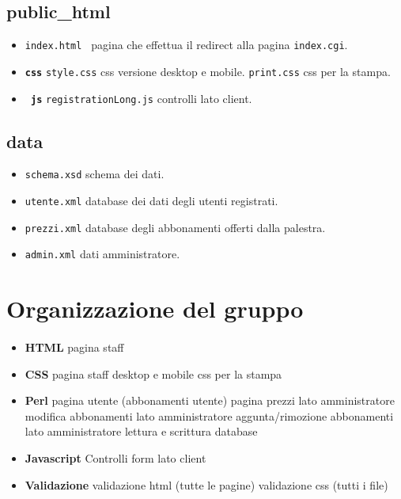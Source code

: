 \documentclass[12pt,a4paper]{article}
\begin{document}
\subsection{public\_html}
\begin{itemize}
	\item \texttt{index.html } pagina che effettua il redirect alla pagina \texttt{index.cgi}.
	\item \texttt{\textbf{css}}
		\subitem \texttt{style.css} css versione desktop e mobile. 
		\subitem \texttt{print.css} css per la stampa.
	\item\texttt{\textbf{ js}}
	\subitem \texttt{registrationLong.js} controlli lato client. 
\end{itemize}
\subsection{data}
\begin{itemize}
	\item \texttt{schema.xsd} schema dei dati. 
	\item \texttt{utente.xml} database dei dati degli utenti registrati. 
	\item \texttt{prezzi.xml} database degli abbonamenti offerti dalla palestra. 
	\item \texttt{admin.xml} dati amministratore. 
\end{itemize}

\section{Organizzazione del gruppo}
\paragraph{\TF{}}
\begin{itemize}
	\item \textbf{HTML}
	\subitem pagina staff
	\item \textbf{CSS}
	\subitem pagina staff desktop e mobile
	\subitem css per la stampa
	\item\textbf{Perl}
	\subitem pagina utente (abbonamenti utente)
	\subitem pagina prezzi lato amministratore
	\subitem modifica abbonamenti lato amministratore
	\subitem aggunta/rimozione abbonamenti lato amministratore
	\subitem lettura e scrittura database
	\item \textbf{Javascript}
	\subitem Controlli form lato client
	\item \textbf{Validazione}
	\subitem validazione html (tutte le pagine)
	\subitem validazione css (tutti i file)
	
	
\end{itemize}
\end{document}
